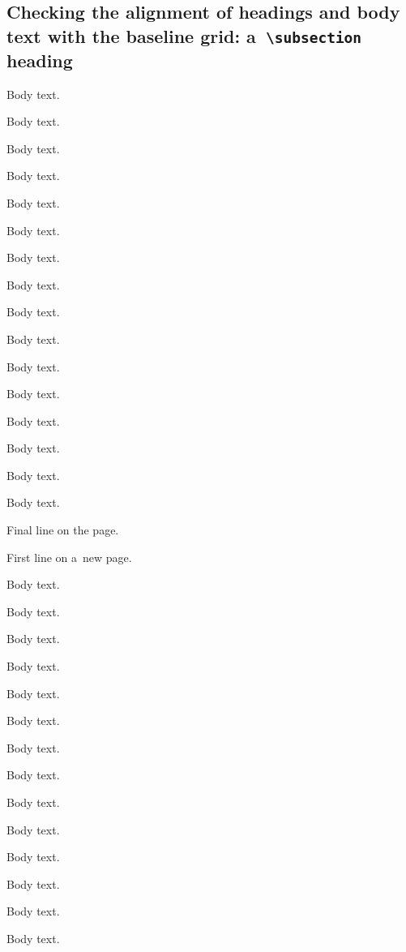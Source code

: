 \subsection*{Checking the alignment of headings and body text with the baseline grid: a~\texttt{\textbackslash subsection} heading}
Body text.\displaybaselinegrid \par
Body text. \par
Body text. \par
Body text. \par
Body text. \par
Body text. \par
Body text. \par
Body text. \par
Body text. \par
Body text. \par
Body text. \par
Body text. \par
Body text. \par
Body text. \par
Body text. \par
Body text. \par
Final line on the page. \par

\pagebreak

First line on a~new page. \par
Body text. \par
Body text. \par
Body text. \par
Body text. \par
Body text. \par
Body text. \par
Body text. \par
Body text. \par
Body text. \par
Body text. \par
Body text. \par
Body text. \par
Body text. \par
Body text. \par
